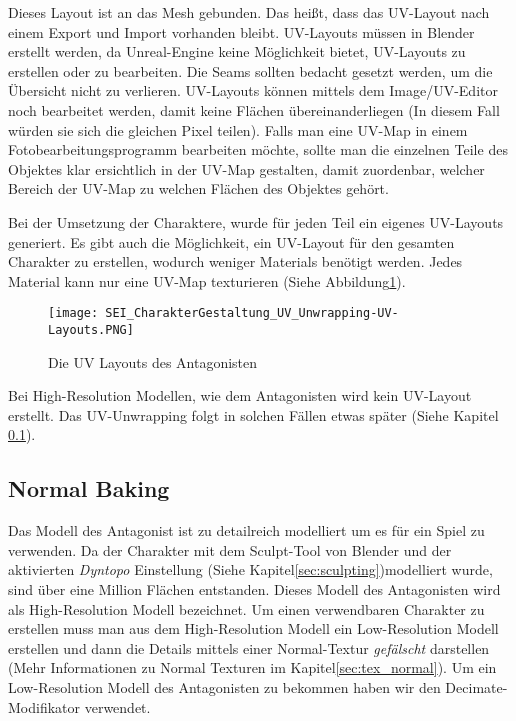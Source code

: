 Dieses Layout ist an das Mesh gebunden. Das heißt, dass das UV-Layout nach einem Export und Import vorhanden bleibt.
UV-Layouts müssen in Blender erstellt werden, da Unreal-Engine keine Möglichkeit bietet, UV-Layouts zu erstellen oder
zu bearbeiten. Die Seams sollten bedacht gesetzt werden, um die Übersicht nicht zu verlieren. UV-Layouts können
mittels dem Image/UV-Editor noch bearbeitet werden, damit keine Flächen übereinanderliegen (In diesem Fall
würden sie sich die gleichen Pixel teilen). Falls man eine UV-Map in einem Fotobearbeitungsprogramm bearbeiten möchte,
sollte man die einzelnen Teile des Objektes klar ersichtlich in der UV-Map gestalten, damit zuordenbar, welcher Bereich
der UV-Map zu welchen Flächen des Objektes gehört.

Bei der Umsetzung der Charaktere, wurde für jeden Teil ein eigenes UV-Layouts generiert. Es gibt auch die Möglichkeit,
ein UV-Layout für den gesamten Charakter zu erstellen, wodurch weniger Materials benötigt werden. Jedes Material kann
nur eine UV-Map texturieren (Siehe Abbildung\ref{picture:uv_layouts}).

\begin{figure}[h]
    \centering
    \texttt{[image: SEI\_CharakterGestaltung\_UV\_Unwrapping-UV-Layouts.PNG]}
    \caption{Die UV Layouts des Antagonisten}
    \label{picture:uv_layouts}
\end{figure}

Bei High-Resolution Modellen, wie dem Antagonisten wird kein UV-Layout erstellt. Das UV-Unwrapping folgt in solchen
Fällen etwas später (Siehe Kapitel \ref{sec:normal_baking}).


\subsection{Normal Baking}
\label{sec:normal_baking}

Das Modell des Antagonist ist zu detailreich modelliert um es für ein Spiel zu verwenden. Da der Charakter mit dem
Sculpt-Tool von Blender und der aktivierten \textit{Dyntopo} Einstellung (Siehe Kapitel\ref{sec:sculpting})modelliert
wurde, sind über eine Million
Flächen entstanden. Dieses Modell des Antagonisten wird als High-Resolution Modell bezeichnet. Um einen verwendbaren
Charakter zu erstellen muss man aus dem High-Resolution Modell ein Low-Resolution Modell erstellen und dann die
Details mittels einer Normal-Textur \textit{gefälscht} darstellen (Mehr Informationen zu Normal Texturen im Kapitel\ref{sec:tex_normal}).
Um ein Low-Resolution Modell des Antagonisten zu bekommen haben wir den Decimate-Modifikator verwendet\citep{blender:mod_decimate}.

